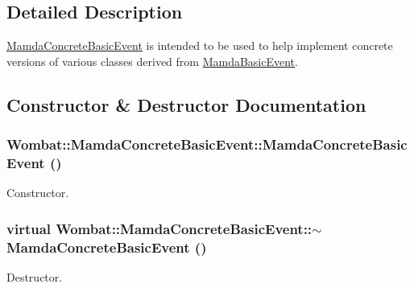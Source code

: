 \subsection{Detailed Description}
\hyperlink{classWombat_1_1MamdaConcreteBasicEvent}{Mamda\-Concrete\-Basic\-Event} is intended to be used to help implement concrete versions of various classes derived from \hyperlink{classWombat_1_1MamdaBasicEvent}{Mamda\-Basic\-Event}. 



\subsection{Constructor \& Destructor Documentation}
\hypertarget{classWombat_1_1MamdaConcreteBasicEvent_48b9267d79c340a4ed80e5f9b2b052b3}{
\subsubsection[MamdaConcreteBasicEvent]{\setlength{\rightskip}{0pt plus 5cm}Wombat::Mamda\-Concrete\-Basic\-Event::Mamda\-Concrete\-Basic\-Event ()}}
\label{classWombat_1_1MamdaConcreteBasicEvent_48b9267d79c340a4ed80e5f9b2b052b3}


Constructor. 

\hypertarget{classWombat_1_1MamdaConcreteBasicEvent_048c2b90c35690af390252fa8569685c}{
\subsubsection[$\sim$MamdaConcreteBasicEvent]{\setlength{\rightskip}{0pt plus 5cm}virtual Wombat::Mamda\-Concrete\-Basic\-Event::$\sim$Mamda\-Concrete\-Basic\-Event ()}}
\label{classWombat_1_1MamdaConcreteBasicEvent_048c2b90c35690af390252fa8569685c}


Destructor. 



